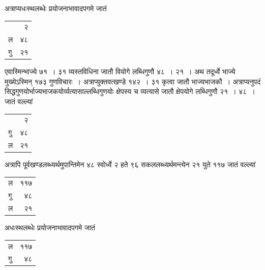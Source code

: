 \documentclass[11pt, openany]{book}
\begin{document}
{{\noindent अत्राप्यधःस्थलब्धेः प्रयोजनाभावादपगमे जातं
\vspace{-2mm}

\begin{table}[h!]
    \centering\s
    \begin{tabular}{lr}
        &२\\
ल &४८\\
गु& २१
    \end{tabular}
\end{table}
\vspace{-2mm}

\noindent एवास्मिन्भाज्ये ७१~। ३१ व्यस्तविधिना जातौ वियोगे लब्धिगुणौ ४८~। २१~।
अथ तदूर्ध्वे भाज्ये मुख्येऽस्मिन् १७३ गुणविचारः~। अत्राप्युक्तवत्खण्डे १४२~। ३१ कृत्वा जातौ भाज्यभाजकौ~। अत्राप्यनुपदं
सिद्धगुणयोर्भाज्यभाजकयोर्व्यत्यासाल्लब्धिगुणयोः 
क्षेपस्य च व्यत्यासे जातौ क्षेपयोगे लब्धिगुणौ २१~। ४८~। जातं
वल्ल्यां
\newpage
\begin{table}[h!]
    \centering\s
    \begin{tabular}{lr}
       &२\\
गु& ४८\\
ल &२१
    \end{tabular}
\end{table}
\vspace{-2mm}

\noindent अत्रापि पूर्वखण्डलब्ध्यर्थमुपान्तिमेन ४८ स्वोर्ध्वे २ हते ९६
सकललब्ध्यर्थमन्त्येन 
२१ युते ११७ जातं वल्ल्यां
\vspace{-2mm}

\begin{table}[h!]
    \centering\s
    \begin{tabular}{lr}
       ल &११७ \\
गु& ४८ \\
ल &२१
    \end{tabular}
\end{table}
\vspace{-2mm}

\noindent अधःस्थलब्धेः प्रयोजनाभावादपगमे जातं
\vspace{-2mm}

\begin{table}[h!]
    \centering\s
    \begin{tabular}{lr}
       ल &११७\\
गु& ४८
    \end{tabular}
\end{table}
\vspace{-2mm}

}}
\end{document}
